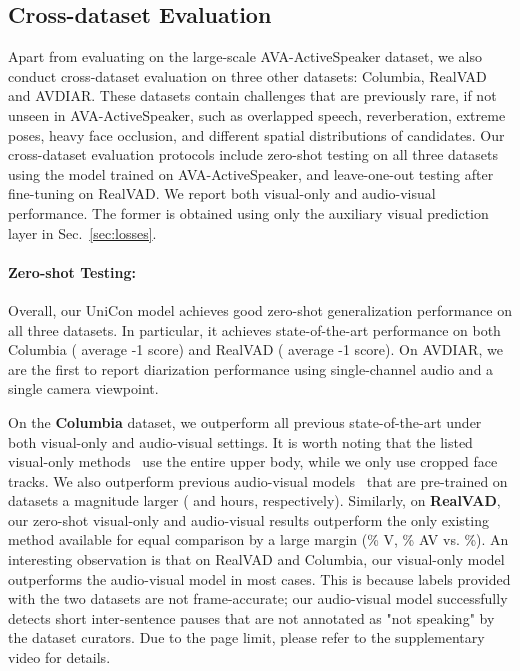 \documentclass[sigconf]{acmart}
\newcommand\NetName{UniCon}
\begin{document}
\begin{CCSXML}
\subsection{Cross-dataset Evaluation}\label{sec:cross-dataset-eval}
Apart from evaluating on the large-scale AVA-ActiveSpeaker dataset, we also conduct cross-dataset evaluation on three other datasets: Columbia, RealVAD and AVDIAR. These datasets contain challenges that are previously rare, if not unseen in AVA-ActiveSpeaker, such as overlapped speech, reverberation, extreme poses, heavy face occlusion, and different spatial distributions of candidates. Our cross-dataset evaluation protocols include zero-shot testing on all three datasets using the model trained on AVA-ActiveSpeaker, and leave-one-out testing after fine-tuning on RealVAD. We report both visual-only and audio-visual performance. The former is obtained using only the auxiliary visual prediction layer  in Sec.~\ref{sec:losses}.
\vspace{-1.5ex}
\paragraph{Zero-shot Testing:}
Overall, our \NetName{} model achieves good zero-shot generalization performance on all three datasets. In particular, it achieves state-of-the-art performance on both Columbia ( average -1 score) and RealVAD ( average -1 score). On AVDIAR, we are the first to report diarization performance using single-channel audio and a single camera viewpoint.

On the \textbf{Columbia} dataset, 
we outperform all previous state-of-the-art under both visual-only and audio-visual settings. It is worth noting that the listed visual-only methods~\cite{DBLP:conf/eccv/ChakravartyT16,DBLP:conf/iccvw/ShahidBM19,Shahid_2021_WACV} use the entire upper body, while we only use cropped face tracks. We also outperform previous audio-visual models~\cite{DBLP:conf/eccv/AfourasOCZ20,DBLP:conf/accv/ChungZ16a} that are pre-trained on datasets a magnitude larger ( and  hours, respectively).
Similarly, on \textbf{RealVAD}, our zero-shot visual-only and audio-visual results outperform the only existing method available for equal comparison by a large margin (\% V, \% AV vs. \%). An interesting observation is that on RealVAD and Columbia, our visual-only model outperforms the audio-visual model in most cases. This is because labels provided with the two datasets are not frame-accurate; our audio-visual model successfully detects short inter-sentence pauses that are not annotated as "not speaking" by the dataset curators. Due to the page limit, please refer to the supplementary video for details.


\end{CCSXML}
\end{document}
